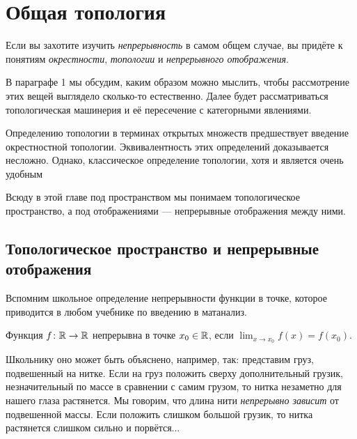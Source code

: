 \section{Общая топология}
Если вы захотите изучить \textit{непрерывность} в самом общем случае, вы придёте к понятиям \textit{окрестности}, \textit{топологии} и \textit{непрерывного отображения}.

В параграфе 1 мы обсудим, каким образом можно мыслить, чтобы рассмотрение этих вещей выглядело сколько-то естественно. Далее будет рассматриваться топологическая машинерия и её пересечение с категорными явлениями.

Определению топологии в терминах открытых множеств предшествует введение окрестностной топологии. Эквивалентность этих определений доказывается несложно. Однако, классическое определение топологии, хотя и является очень удобным 

Всюду в этой главе под пространством мы понимаем топологическое пространство, а под отображениями --- непрерывные отображения между ними.

\subsection{Топологическое пространство и непрерывные отображения}
Вспомним школьное определение непрерывности функции в точке, которое приводится в любом учебнике по введению в матанализ.
\begin{defin}
	Функция $f\colon\mathbb {R}\to\mathbb {R}$ непрерывна в точке $x_0\in\mathbb {R}$, если $\displaystyle\lim_{x\to x_0} f(x)=f(x_0)$.
\end{defin}
Школьнику оно может быть объяснено, например, так: представим груз, подвешенный на нитке. Если на груз положить сверху дополнительный грузик, незначительный по массе в сравнении с самим грузом, то нитка незаметно для нашего глаза растянется. Мы говорим, что длина нити \textit{непрерывно зависит} от подвешенной массы. Если положить слишком большой грузик, то нитка растянется слишком сильно и порвётся...

